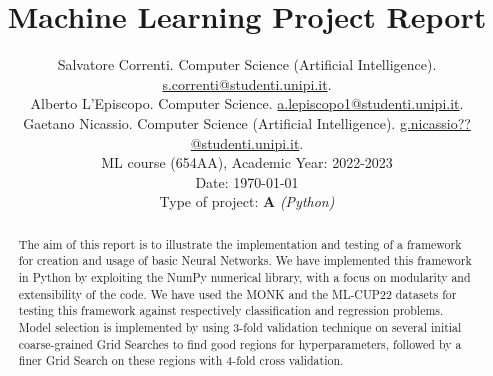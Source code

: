 \documentclass[12pt, letterpaper]{article}  %
\title{\vspace{-2cm}\textbf{Machine Learning Project Report}}
\author{\small{Salvatore Correnti.}
        \small{Computer Science (Artificial Intelligence). \underline{s.correnti@studenti.unipi.it}.} \\ \small{Alberto L'Episcopo.}
        \small{Computer Science. \underline{a.lepiscopo1@studenti.unipi.it}.} \\\small{Gaetano Nicassio.}
        \small{Computer Science (Artificial Intelligence). \underline{g.nicassio??@studenti.unipi.it}.} \\  %
        \small{ML course (654AA), Academic Year: 2022-2023} \\
        \small{Date: \today} \\
        \small{Type of project: \textbf{A} \textit{(Python)}}
}
\begin{document}
\nocite{*}  %
\date{}
\maketitle

\begin{abstract}
  The aim of this report is to illustrate the implementation and testing of a framework for creation and usage of basic Neural Networks.
  We have implemented this framework in Python by exploiting the NumPy numerical library, with a focus on modularity and extensibility of the code.
  We have used the MONK and the ML-CUP22 datasets for testing this framework against respectively classification and regression problems.
  Model selection is implemented by using 3-fold validation technique on several initial coarse-grained Grid Searches to find good regions for hyperparameters,
  followed by a finer Grid Search on these regions with 4-fold cross validation.

\end{abstract}




\end{document}
